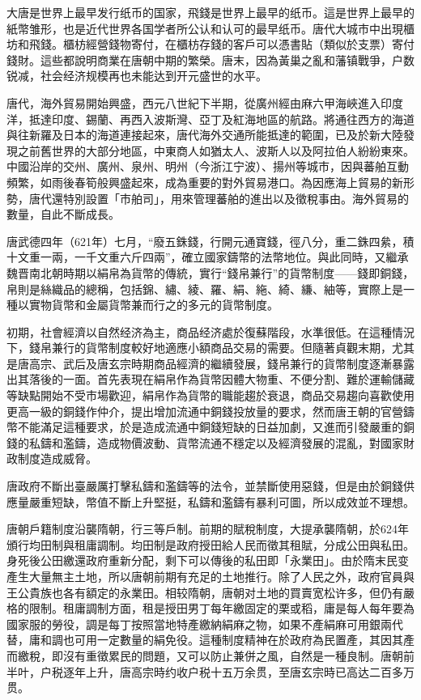 大唐是世界上最早发行纸币的国家，飛錢是世界上最早的纸币。這是世界上最早的紙幣雏形，也是近代世界各国学者所公认和认可的最早纸币。唐代大城市中出現櫃坊和飛錢。櫃枋經營錢物寄付，在櫃枋存錢的客戶可以憑書貼（類似於支票）寄付錢財。這些都說明商業在唐朝中期的繁榮。唐末，因為黃巢之亂和藩镇戰爭，户数锐减，社会经济规模再也未能达到开元盛世的水平。

唐代，海外貿易開始興盛，西元八世紀下半期，從廣州經由麻六甲海峽進入印度洋，抵達印度、錫蘭、再西入波斯灣、亞丁及紅海地區的航路。將通往西方的海道與往新羅及日本的海道連接起來，唐代海外交通所能抵達的範圍，已及於新大陸發現之前舊世界的大部分地區，中東商人如猶太人、波斯人以及阿拉伯人紛紛東來。中國沿岸的交州、廣州、泉州、明州（今浙江宁波）、揚州等城市，因與蕃舶互動頻繁，如雨後春筍般興盛起來，成為重要的對外貿易港口。為因應海上貿易的新形勢，唐代還特別設置「市舶司」，用來管理蕃舶的進出以及徵稅事由。海外貿易的數量，自此不斷成長。

唐武德四年（621年）七月，“廢五銖錢，行開元通寶錢，徑八分，重二銖四絫，積十文重一兩，一千文重六斤四兩”，確立國家鑄幣的法幣地位。與此同時，又繼承魏晋南北朝時期以絹帛為貨幣的傳統，實行“錢帛兼行”的貨幣制度——錢即銅錢，帛則是絲織品的總稱，包括錦、繡、綾、羅、絹、絁、綺、縑、紬等，實際上是一種以實物貨幣和金屬貨幣兼而行之的多元的貨幣制度。

初期，社會經濟以自然经济為主，商品经济處於復蘇階段，水準很低。在這種情況下，錢帛兼行的貨幣制度較好地適應小額商品交易的需要。但隨著貞觀末期，尤其是唐高宗、武后及唐玄宗時期商品經濟的繼續發展，錢帛兼行的貨幣制度逐漸暴露出其落後的一面。首先表現在絹帛作為貨幣因體大物重、不便分割、難於運輸儲藏等缺點開始不受市場歡迎，絹帛作為貨幣的職能趨於衰退，商品交易趨向喜歡使用更高一級的銅錢作仲介，提出增加流通中銅錢投放量的要求，然而唐王朝的官營鑄幣不能滿足這種要求，於是造成流通中銅錢短缺的日益加劇，又進而引發嚴重的銅錢的私鑄和濫鑄，造成物價波動、貨幣流通不穩定以及經濟發展的混亂，對國家財政制度造成威脅。

唐政府不斷出臺嚴厲打擊私鑄和濫鑄等的法令，並禁斷使用惡錢，但是由於銅錢供應量嚴重短缺，幣值不斷上升堅挺，私鑄和濫鑄有暴利可圖，所以成效並不理想。

唐朝戶籍制度沿襲隋朝，行三等戶制。前期的賦稅制度，大提承襲隋朝，於624年頒行均田制與租庸調制。均田制是政府授田給人民而徵其租賦，分成公田與私田。身死後公田繳還政府重新分配，剩下可以傳後的私田即「永業田」。由於隋末民变產生大量無主土地，所以唐朝前期有充足的土地推行。除了人民之外，政府官員與王公貴族也各有額定的永業田。相较隋朝，唐朝对土地的買賣宽松许多，但仍有嚴格的限制。租庸調制方面，租是授田男丁每年繳固定的栗或稻，庸是每人每年要為國家服的勞役，調是每丁按照當地特產繳納絹麻之物，如果不產絹麻可用銀兩代替，庸和調也可用一定數量的絹免役。這種制度精神在於政府為民置產，其因其產而繳稅，即沒有重徵累民的問題，又可以防止兼併之風，自然是一種良制。唐朝前半叶，户税逐年上升，唐高宗時约收户税十五万余贯，至唐玄宗時已高达二百多万贯。

